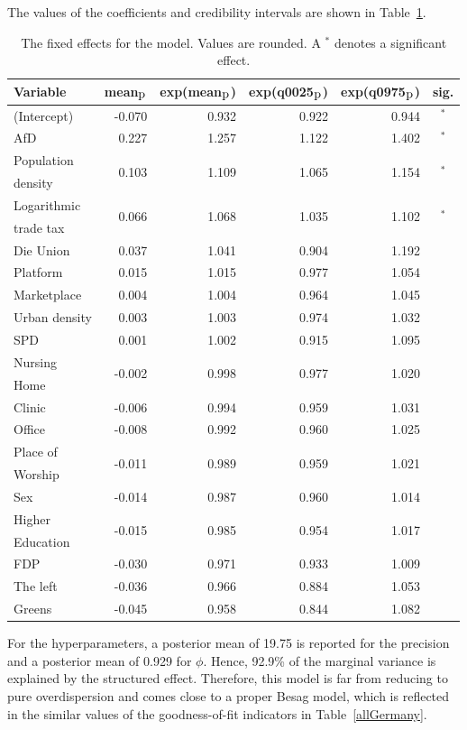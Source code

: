 \clearpage
The values of the coefficients and credibility intervals are shown in Table~\ref{FixedAllGermany_spatial}.
\begin{table}[H]
\caption{The fixed effects for the model. Values are rounded. A $^*$ denotes a significant effect. \label{FixedAllGermany_spatial}}
\begin{tabular}{l r r r r c}
\toprule
\textbf{Variable}	& \textbf{mean$_{\hbox{p}}$}	& \textbf{exp(mean$_{\hbox{p}}$)} & \textbf{exp(q0025$_{\hbox{p}}$)} & \textbf{exp(q0975$_{\hbox{p}}$)} & \textbf{sig.}\\
\midrule
(Intercept) & -0.070 & 0.932 & 0.922 & 0.944 & $^*$\\
AfD & 0.227 & 1.257 & 1.122 & 1.402 & $^*$\\
Population & \multirow{2}{*}{0.103} & \multirow{2}{*}{1.109} & \multirow{2}{*}{1.065} & \multirow{2}{*}{1.154} & \multirow{2}{*}{$^*$}\\
density \\
Logarithmic & \multirow{2}{*}{0.066} & \multirow{2}{*}{1.068} & \multirow{2}{*}{1.035} & \multirow{2}{*}{1.102} & \multirow{2}{*}{$^*$}\\
trade tax \\
Die Union & 0.037 & 1.041 & 0.904 & 1.192\\
Platform & 0.015 & 1.015 & 0.977 & 1.054 \\
Marketplace & 0.004 & 1.004 & 0.964 & 1.045 \\
Urban density & 0.003 & 1.003 & 0.974 & 1.032 \\
SPD & 0.001 & 1.002 & 0.915 & 1.095\\
Nursing& \multirow{2}{*}{-0.002} & \multirow{2}{*}{0.998} & \multirow{2}{*}{0.977} & \multirow{2}{*}{1.020} \\
Home\\
Clinic & -0.006 & 0.994 & 0.959 & 1.031 \\
Office & -0.008 & 0.992 & 0.960 & 1.025 \\
Place of & \multirow{2}{*}{-0.011} & \multirow{2}{*}{0.989} & \multirow{2}{*}{0.959} & \multirow{2}{*}{1.021} \\
Worship\\
Sex & -0.014 & 0.987 & 0.960 & 1.014 & \\
Higher & \multirow{2}{*}{-0.015} & \multirow{2}{*}{0.985} & \multirow{2}{*}{0.954} & \multirow{2}{*}{1.017} \\
Education\\
FDP & -0.030 & 0.971 & 0.933& 1.009 \\
The left & -0.036 & 0.966 & 0.884 & 1.053\\
Greens & -0.045 & 0.958 & 0.844 & 1.082 \\
\bottomrule
\end{tabular}
\end{table}
For the hyperparameters, a posterior mean of 19.75 is reported for the precision and a posterior mean of 0.929 for $\phi$. Hence, 92.9\% of the marginal variance is explained by the structured effect. Therefore, this model is far from reducing to pure overdispersion and comes close to a proper Besag model, which is reflected in the similar values of the goodness-of-fit indicators in Table~\ref{allGermany}.
